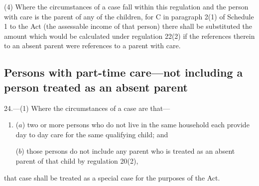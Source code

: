 \documentclass[12pt,a4paper]{article}
\begin{document}
(4) Where the circumstances of a case fall within this regulation and the person with care is the parent of any of the children, for C in paragraph 2(1) of Schedule 1 to the Act (the assessable income of that person) there shall be substituted the amount which would be calculated under regulation 22(2) if the references therein to an absent parent were references to a parent with care.


\subsection[24. Persons with part-time care—not including a person treated as an absent parent]{Persons with part-time care—not including a person treated as an absent parent}

24.—(1) Where the circumstances of a case are that—
\begin{enumerate}\item[]
($a$) two or more persons who do not live in the same household each provide day to day care for the same qualifying child; and

($b$) those persons do not include any parent who is treated as an absent parent of that child by regulation 20(2),
\end{enumerate}
that case shall be treated as a special case for the purposes of the Act.
\end{document}
